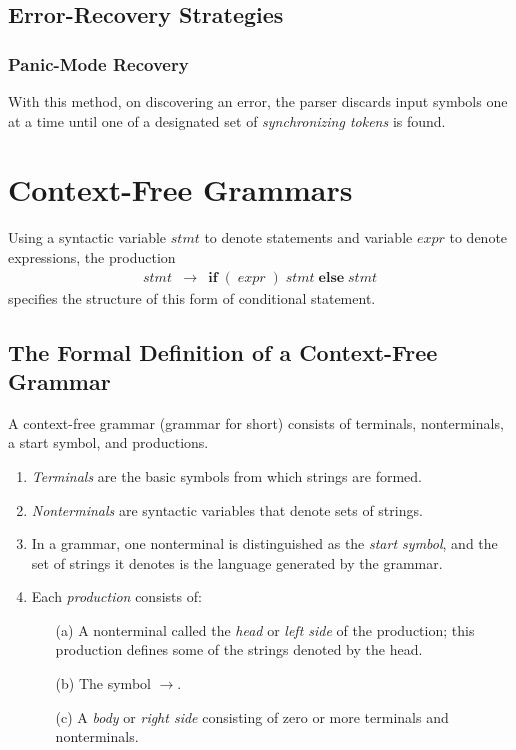 \documentclass[12pt,a4paper,twoside,openany]{book}
\begin{document}
\subsection{Error-Recovery Strategies}
\subsubsection{Panic-Mode Recovery}

With this method, on discovering an error, the parser discards input symbols one at a time until one of a designated set of \textit{synchronizing tokens} is found.

\section{Context-Free Grammars}

Using a syntactic variable $stmt$ to denote statements and variable $expr$ to denote expressions, the production
\begin{equation}
    \begin{array}{ccc}stmt&\rightarrow&\textbf{if}\;(\;expr\;)\;stmt\;\textbf{else}\;stmt\end{array}
    \label{4.4}
\end{equation}
specifies the structure of this form of conditional statement.

\subsection{The Formal Definition of a Context-Free Grammar}

A context-free grammar (grammar for short) consists of terminals, nonterminals, a start symbol, and productions.
\begin{enumerate}
    \item\textit{Terminals} are the basic symbols from which strings are formed.
    \item\textit{Nonterminals} are syntactic variables that denote sets of strings.
    \item In a grammar, one nonterminal is distinguished as the \textit{start symbol}, and the set of strings it denotes is the language generated by the grammar.
    \item Each \textit{production} consists of:
    \begin{itemize}
        \item[(a)] A nonterminal called the \textit{head} or \textit{left side} of the production; this production defines some of the strings denoted by the head.
        \item[(b)] The symbol $\rightarrow$.
        \item[(c)] A \textit{body} or \textit{right side} consisting of zero or more terminals and nonterminals.
    \end{itemize}
\end{enumerate}
\end{document}
